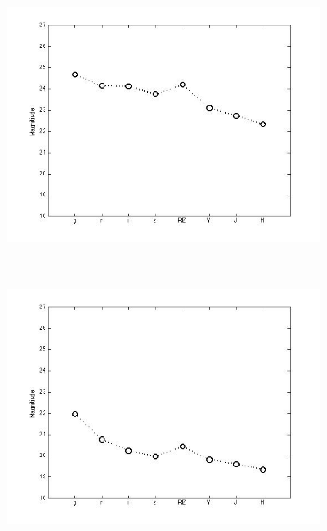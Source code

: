 \documentclass[useAMS,usenatbib,fleqn]{mn2e}
\begin{document}
\begin{figure}
\begin{subfigure}[b]{0.075\textwidth}
                \includegraphics[trim = 35px 15px 50px 25px, clip=true,width=\textwidth]{basis_05.jpg}
        \end{subfigure}
        ~
        \begin{subfigure}[b]{0.075\textwidth}
                \includegraphics[trim = 35px 15px 50px 25px, clip=true,width=\textwidth]{basis_06.jpg}
        \end{subfigure}
        ~
        \begin{subfigure}[b]{0.075\textwidth}

\end{subfigure}
\end{figure}
\end{document}
